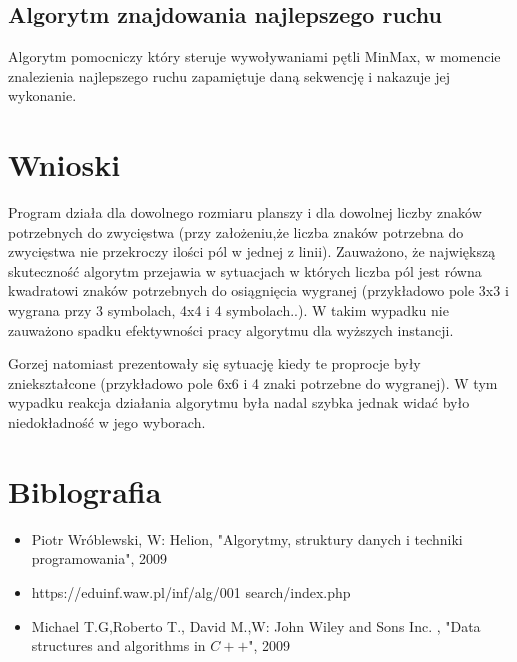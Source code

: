 \documentclass[10pt,a4paper]{article} %
\begin{document}
	\subsection{Algorytm znajdowania najlepszego ruchu}
	Algorytm pomocniczy który steruje wywoływaniami pętli MinMax, w momencie znalezienia najlepszego ruchu zapamiętuje daną sekwencję i nakazuje jej wykonanie.
	\section{Wnioski}
	Program działa dla dowolnego rozmiaru planszy i dla dowolnej liczby znaków potrzebnych do zwycięstwa (przy założeniu,że liczba znaków potrzebna do zwycięstwa nie przekroczy ilości pól w jednej z linii). Zauważono, że największą skuteczność algorytm przejawia w sytuacjach w których liczba pól jest równa kwadratowi znaków potrzebnych do osiągnięcia wygranej (przykładowo pole 3x3 i wygrana przy 3 symbolach, 4x4 i 4 symbolach..). W takim wypadku nie zauważono spadku efektywności pracy algorytmu dla wyższych instancji. \par Gorzej natomiast prezentowały się sytuację kiedy te proprocje były zniekształcone (przykładowo pole 6x6 i 4 znaki potrzebne do wygranej). W tym wypadku reakcja działania algorytmu była nadal szybka jednak widać było niedokładność w jego wyborach.
	\section{Biblografia}
	\begin{itemize}
	\item Piotr Wróblewski, W: Helion, "Algorytmy, struktury danych i techniki programowania", 2009
	\item https://eduinf.waw.pl/inf/alg/001 search/index.php
	\item Michael T.G,Roberto T., David M.,W: John Wiley and Sons Inc. , "Data structures and algorithms in $C++$", 2009 
	\end{itemize}

		
\end{document}
